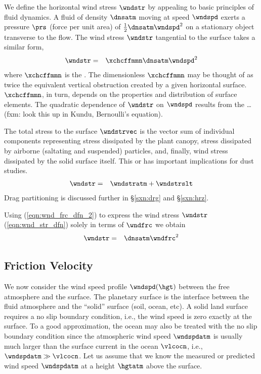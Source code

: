 \documentclass[12pt,twoside]{book}
\begin{document}
We define the horizontal wind stress $\wndstr$ by appealing to basic
principles of fluid dynamics.
A fluid of density $\dnsatm$ moving at speed $\wndspd$ exerts a
pressure $\prs$ (force per unit area) of $\frac{1}{2} \dnsatm
\wndspd^{2}$ on a stationary object transverse to the flow. 
The wind stress $\wndstr$ tangential to the surface takes a similar
form,
\begin{eqnarray}
\wndstr & = & \xchcffmmn \dnsatm \wndspd^{2}
\label{eqn:wnd_str_dfn}
\end{eqnarray}
where $\xchcffmmn$ is the .
The dimensionless $\xchcffmmn$ may be thought of as twice the
equivalent vertical obstruction created by a given horizontal surface.  
$\xchcffmmn$, in turn, depends on the properties and distribution of
surface elements.
The quadratic dependence of $\wndstr$ on $\wndspd$ results from the
\ldots (fxm: look this up in Kundu, Bernoulli's equation).

The total stress to the surface $\wndstrvec$ is the vector sum of  
individual components representing stress dissipated by the plant
canopy, stress dissipated by airborne (saltating and suspended)
particles, and, finally, wind stress dissipated by the solid surface
itself. 
This  or  has 
important implications for dust studies.
\begin{eqnarray}
\wndstr & = & \wndstratm + \wndstrslt
\label{eqn:wnd_str_prt}
\end{eqnarray}
Drag partitioning is discussed further in \S\ref{sxn:drg} and 
\S\ref{sxn:hrz}. 

Using (\ref{eqn:wnd_frc_dfn_2}) to express the wind stress $\wndstr$
(\ref{eqn:wnd_str_dfn}) solely in terms of $\wndfrc$ we obtain
\begin{eqnarray}
\wndstr & = & \dnsatm \wndfrc^{2}
\label{eqn:wnd_str_dfn_2}
\end{eqnarray}

\subsection[Friction Velocity]{Friction Velocity}
We now consider the wind speed profile $\wndspd(\hgt)$ between the
free atmosphere and the surface.
The planetary surface is the interface between the fluid atmosphere
and the ``solid'' surface (soil, ocean, etc). 
A solid land surface requires a no slip boundary condition, i.e., the
wind speed is zero exactly at the surface.
To a good approximation, the ocean may also be treated with the no
slip boundary condition since the atmospheric wind speed $\wndspdatm$
is usually much larger than the surface current in the ocean
$\vlcocn$, i.e., $\wndspdatm \gg \vlcocn$.
Let us assume that we know the measured or predicted wind speed
$\wndspdatm$ at a height $\hgtatm$ above the surface.
\end{document}
